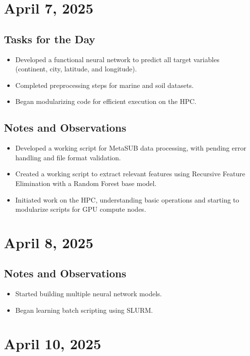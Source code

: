 \documentclass{article}
\begin{document}
\section{April 7, 2025}

\subsection*{Tasks for the Day}
\begin{itemize}
    \item Developed a functional neural network to predict all target variables (continent, city, latitude, and longitude).
    \item Completed preprocessing steps for marine and soil datasets.
    \item Began modularizing code for efficient execution on the HPC.
\end{itemize}

\subsection*{Notes and Observations}
\begin{itemize}
    \item Developed a working script for MetaSUB data processing, with pending error handling and file format validation.
    \item Created a working script to extract relevant features using Recursive Feature Elimination with a Random Forest base model.
    \item Initiated work on the HPC, understanding basic operations and starting to modularize scripts for GPU compute nodes.
\end{itemize}

\section{April 8, 2025}
\subsection*{Notes and Observations}
\begin{itemize}
    \item Started building multiple neural network models.
    \item Began learning batch scripting using SLURM.
\end{itemize}

\section{April 10, 2025}
\end{document}
